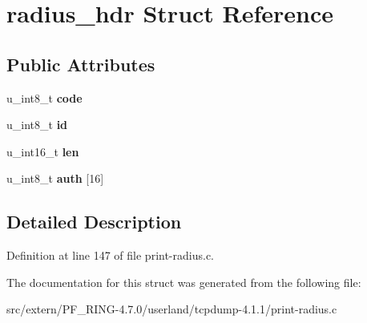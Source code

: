\hypertarget{structradius__hdr}{
\section{radius\_\-hdr Struct Reference}
\label{structradius__hdr}
}
\subsection*{Public Attributes}
\begin{DoxyCompactItemize}
\item 
\hypertarget{structradius__hdr_af02f79b702431879c97ce32a778a30fc}{
u\_\-int8\_\-t {\bfseries code}}
\label{structradius__hdr_af02f79b702431879c97ce32a778a30fc}

\item 
\hypertarget{structradius__hdr_a1ba3cfd89e29afcd89ebf7960f6c59d3}{
u\_\-int8\_\-t {\bfseries id}}
\label{structradius__hdr_a1ba3cfd89e29afcd89ebf7960f6c59d3}

\item 
\hypertarget{structradius__hdr_a45b5d0adb04bddb5c2f0d2419f7292e7}{
u\_\-int16\_\-t {\bfseries len}}
\label{structradius__hdr_a45b5d0adb04bddb5c2f0d2419f7292e7}

\item 
\hypertarget{structradius__hdr_a16cf75c46ede2ed11771a7b91e4fb45e}{
u\_\-int8\_\-t {\bfseries auth} \mbox{[}16\mbox{]}}
\label{structradius__hdr_a16cf75c46ede2ed11771a7b91e4fb45e}

\end{DoxyCompactItemize}


\subsection{Detailed Description}


Definition at line 147 of file print-\/radius.c.



The documentation for this struct was generated from the following file:\begin{DoxyCompactItemize}
\item 
src/extern/PF\_\-RING-\/4.7.0/userland/tcpdump-\/4.1.1/print-\/radius.c\end{DoxyCompactItemize}
